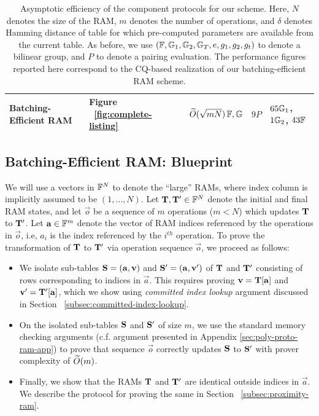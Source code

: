 \begin{table}[bt]
\begin{tabular}{l|l|l|l|l}
        \rowcolor{lightgray}
        {Batching-Efficient RAM}                                                                          & {Figure  ~\ref{fig:complete-listing}}    & {$\widetilde{O}(\sqrt{mN})\,\mathbb{F},\mathbb{G}$}            & ${9P}$            & {$65\mathbb{G}_1$, $1\mathbb{G}_2$, $43\mathbb{F}$}  \\ \hline
    \end{tabular}
    \caption{Asymptotic efficiency of the component protocols for our scheme. Here, $N$ denotes the size of the RAM, $m$ denotes the number of operations,
    and $\delta$ denotes Hamming distance of table for which pre-computed parameters are available from the current table. As before, we use $(\mathbb{F},\mathbb{G}_1,\mathbb{G}_2,\mathbb{G}_T, e, g_1, g_2,g_t)$ to denote a bilinear group, and $P$ to denote a pairing evaluation. The performance figures reported here correspond to the CQ-based realization of our batching-efficient RAM scheme.}
    \label{tbl:efficiency-components}
    \vspace*{-5mm}
\end{table}



\subsection{Batching-Efficient RAM: Blueprint}\label{subsec:batching-efficient-ram-blueprint}
We will use a vectors in $\mathbb{F}^N$ to denote the ``large'' RAMs, where index column is implicitly
assumed to be $(1,\ldots,N)$.
Let $\mathbf{T},\mathbf{T'}\in \mathbb{F}^N$ denote the initial and final RAM states, and let $\vec{o}$ be
a sequence of $m$ operations ($m < N$) which updates $\mathbf{T}$ to $\mathbf{T}'$. Let $\mathbf{a}\in \mathbb{F}^m$ denote the vector
of RAM indices referenced by the operations in $\vec{o}$, i.e, $a_i$ is the index referenced by the $i^{th}$ operation.
To prove the transformation of $\mathbf{T}$ to $\mathbf{T}'$ via operation sequence $\vec{o}$, we proceed as follows:
\begin{itemize}[leftmargin=1em, label=-]
    \item We isolate sub-tables $\mathbf{S}=(\mathbf{a},\mathbf{v})$ and $\mathbf{S}'=(\mathbf{a},\mathbf{v'})$ of $\mathbf{T}$ and $\mathbf{T}'$ consisting of
    rows corresponding to indices in $\vec{a}$. This requires proving $\mathbf{v}=\mathbf{T}[\mathbf{a}]$ and $\mathbf{v'}=
    \mathbf{T}'[\mathbf{a}]$, which we show using {\em committed index lookup} argument discussed in Section ~\ref{subsec:committed-index-lookup}.

    \item On the isolated sub-tables $\mathbf{S}$ and $\mathbf{S}'$ of size $m$, we use the standard memory checking arguments (c.f. argument
    presented in Appendix \ref{sec:poly-proto-ram-app}) to prove that sequence $\vec{o}$ correctly updates $\mathbf{S}$ to $\mathbf{S}'$ with
    prover complexity of $\widetilde{O}(m)$.

    \item Finally, we show that the RAMs $\mathbf{T}$ and $\mathbf{T}'$ are identical outside indices in $\vec{a}$. We describe the protocol
    for proving the same in Section ~\ref{subsec:proximity-ram}.
\end{itemize}

